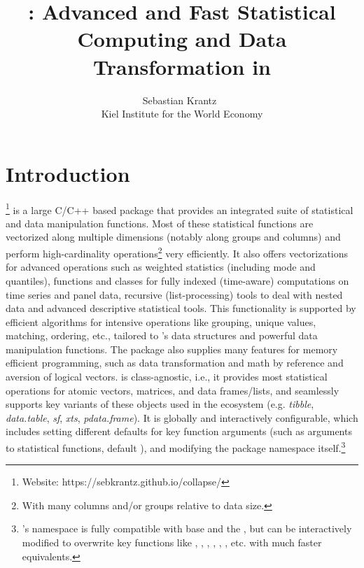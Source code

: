 \documentclass[article]{jss}
\author{Sebastian Krantz~\orcidlink{0000-0001-6212-5229}\\Kiel Institute for the World Economy}
\title{\proglang{collapse}: Advanced and Fast Statistical Computing and Data Transformation in \proglang{R}}
\begin{document}


\section[Introduction]{Introduction} \label{sec:intro}
%
\href{https://sebkrantz.github.io/collapse/}{}\footnote{Website: https://sebkrantz.github.io/collapse/} is a large C/C++ based  package that provides an integrated suite of statistical and data manipulation functions. Most of these statistical functions are vectorized along multiple dimensions (notably along groups and columns) and perform high-cardinality operations\footnote{With many columns and/or groups relative to data size.} very efficiently. It also offers vectorizations for advanced operations such as weighted statistics (including mode and quantiles), functions and classes for fully indexed (time-aware) computations on time series and panel data, recursive (list-processing) tools to deal with nested data and advanced descriptive statistical tools. This functionality is supported by efficient algorithms for intensive operations like grouping, unique values, matching, ordering, etc., tailored to 's data structures and powerful data manipulation functions. The package also supplies many features for memory efficient  programming, such as data transformation and math by reference and aversion of logical vectors.  is class-agnostic, i.e., it provides most statistical operations for atomic vectors, matrices, and data frames/lists, and seamlessly supports key variants of these objects used in the  ecosystem (e.g. \emph{tibble}, \emph{data.table}, \emph{sf}, \emph{xts}, \emph{pdata.frame}). It is globally and interactively configurable, which includes setting different defaults for key function arguments (such as  arguments to statistical functions, default ), and modifying the package namespace itself.\footnote{'s namespace is fully compatible with base  and the , but can be interactively modified to overwrite key functions like , , , , , ,  etc. with much faster  equivalents.} \newline
\end{document}
